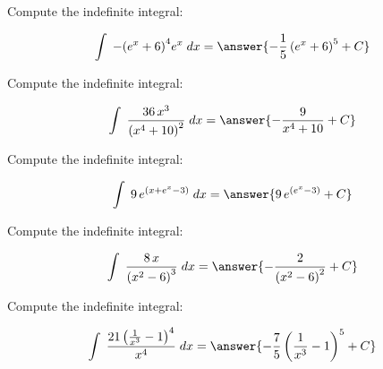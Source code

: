 \documentclass[]{ximera}
\begin{document}

\renewcommand{\latexProblemContent}[1]{#1}



\latexProblemContent{
\begin{problem}

Compute the indefinite integral:



\[\int\;{-{\left(e^{x} + 6\right)}^{4} e^{x}}\;dx = \answer{{-\frac{1}{5} \, {\left(e^{x} + 6\right)}^{5}}+C}\]
\end{problem}}%



\latexProblemContent{
\begin{problem}

Compute the indefinite integral:



\[\int\;{\frac{36 \, x^{3}}{{\left(x^{4} + 10\right)}^{2}}}\;dx = \answer{{-\frac{9}{x^{4} + 10}}+C}\]
\end{problem}}%



\latexProblemContent{
\begin{problem}

Compute the indefinite integral:



\[\int\;{9 \, e^{\left(x + e^{x} - 3\right)}}\;dx = \answer{{9 \, e^{\left(e^{x} - 3\right)}}+C}\]
\end{problem}}%



\latexProblemContent{
\begin{problem}

Compute the indefinite integral:



\[\int\;{\frac{8 \, x}{{\left(x^{2} - 6\right)}^{3}}}\;dx = \answer{{-\frac{2}{{\left(x^{2} - 6\right)}^{2}}}+C}\]
\end{problem}}%



\latexProblemContent{
\begin{problem}

Compute the indefinite integral:



\[\int\;{\frac{21 \, {\left(\frac{1}{x^{3}} - 1\right)}^{4}}{x^{4}}}\;dx = \answer{{-\frac{7}{5} \, {\left(\frac{1}{x^{3}} - 1\right)}^{5}}+C}\]
\end{problem}}%
\end{document}
